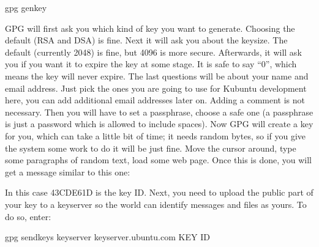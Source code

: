 \documentclass[letterpaper,10pt,english]{sphinxmanual}
\begin{document}
%
\begin{sphinxVerbatim}[commandchars=\\\{\}]
\PYGZdl{} gpg \PYGZhy{}\PYGZhy{}gen\PYGZhy{}key
\end{sphinxVerbatim}

GPG will first ask you which kind of key you want to generate. Choosing the default (RSA and DSA) is fine. Next it will ask you about the keysize. The default (currently 2048) is fine, but 4096 is more secure. Afterwards, it will ask you if you want it to expire the key at some stage. It is safe to say “0”, which means the key will never expire. The last questions will be about your name and email address. Just pick the ones you are going to use for Kubuntu development here, you can add additional email addresses later on. Adding a comment is not necessary. Then you will have to set a passphrase, choose a safe one (a passphrase is just a password which is allowed to include spaces).
Now GPG will create a key for you, which can take a little bit of time; it needs random bytes, so if you give the system some work to do it will be just fine. Move the cursor around, type some paragraphs of random text, load some web page.
Once this is done, you will get a message similar to this one:

%
\begin{sphinxVerbatim}[commandchars=\\\{\}]
    
                   
     
    
\end{sphinxVerbatim}

In this case 43CDE61D is the key ID.
Next, you need to upload the public part of your key to a keyserver so the world can identify messages and files as yours. To do so, enter:

%
\begin{sphinxVerbatim}[commandchars=\\\{\}]
\PYGZdl{} gpg \PYGZhy{}\PYGZhy{}send\PYGZhy{}keys \PYGZhy{}\PYGZhy{}keyserver keyserver.ubuntu.com \PYGZlt{}KEY ID\PYGZgt{}
\end{sphinxVerbatim}
\end{document}
